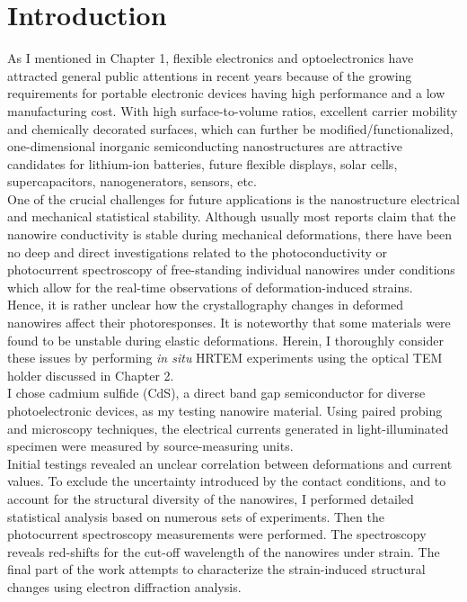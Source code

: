 \section{Introduction}
As I mentioned in Chapter 1, flexible electronics and optoelectronics have attracted general public attentions in recent years because of the growing requirements for portable electronic devices having high performance and a low manufacturing cost.\cite{Boland2010,Liu2015,Long2012} 
With high surface-to-volume ratios, excellent carrier mobility and chemically decorated surfaces, which can further be modified/functionalized, one-dimensional inorganic semiconducting nanostructures are attractive candidates for lithium-ion batteries,\cite{Wang2015} future flexible displays,\cite{Klauk2008} solar cells,\cite{Zhang2012} supercapacitors,\cite{Li2014} nanogenerators,\cite{Fan2012} sensors,\cite{Zhang2014d} etc. \\
One of the crucial challenges for future applications is the nanostructure electrical and mechanical statistical stability. 
Although usually most reports claim that the nanowire conductivity is stable during mechanical deformations, there have been no deep and direct investigations related to the photoconductivity or photocurrent spectroscopy of free-standing individual nanowires under conditions which allow for the real-time observations of deformation-induced strains. \\
Hence, it is rather unclear how the crystallography changes in deformed nanowires affect their photoresponses. 
It is noteworthy that some materials were found to be unstable during elastic deformations.\cite{Antsov2014}
Herein, I thoroughly consider these issues by performing {\em in situ} HRTEM experiments using the optical TEM holder discussed in Chapter 2. \\

I chose cadmium sulfide (CdS), a direct band gap semiconductor for diverse photoelectronic devices, as my testing nanowire material.\cite{Xing2015} 
Using paired probing and microscopy techniques, the electrical currents generated in light-illuminated specimen were measured by source-measuring units. \\
Initial testings revealed an unclear correlation between deformations and current values. 
To exclude the uncertainty introduced by the contact conditions, and to account for the structural diversity of the nanowires, I performed detailed statistical analysis based on numerous sets of experiments. 
Then the photocurrent spectroscopy measurements were performed. The spectroscopy reveals red-shifts for the cut-off wavelength of the nanowires under strain. 
The final part of the work attempts to characterize the strain-induced structural changes using electron diffraction analysis. 

